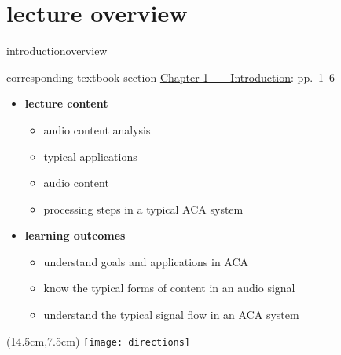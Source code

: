 




\subtitle{Module 1.0: Introduction to MIR/ACA}


	

    \section[overview]{lecture overview}
        \begin{frame}{introduction}{overview}
            \begin{block}{corresponding textbook section}
                    \href{http://ieeexplore.ieee.org/xpl/articleDetails.jsp?tp=&arnumber=6331118&}{Chapter 1~---~Introduction}: pp.~1--6
            \end{block}

            \begin{itemize}
                \item   \textbf{lecture content}
                    \begin{itemize}
                        \item   audio content analysis
                        \item   typical applications
                        \item   audio content
                        \item   processing steps in a typical ACA system
                    \end{itemize}
                \bigskip
                \item<2->   \textbf{learning outcomes}
                    \begin{itemize}
                        \item   understand goals and applications in ACA
                        \item   know the typical forms of content in an audio signal
                        \item   understand the typical signal flow in an ACA system
                    \end{itemize}
            \end{itemize}
            \begin{textblock*}{100mm}(14.5cm,7.5cm)
                \texttt{[image: directions]}
            \end{textblock*}
        \end{frame}
        
